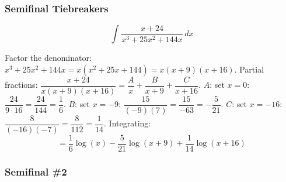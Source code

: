 \subsubsection*{Semifinal Tiebreakers}

\begin{questions}

\question
\[ \int \frac{x+24}{x^3+25x^2+144x}\,dx \]
\begin{solution}
Factor the denominator: $x^3+25x^2+144x=x(x^2+25x+144)=x(x+9)(x+16)$.
Partial fractions: $\dfrac{x+24}{x(x+9)(x+16)}=\dfrac{A}{x}+\dfrac{B}{x+9}+\dfrac{C}{x+16}$.
$A$: set $x=0$: $\dfrac{24}{9\cdot16}=\dfrac{24}{144}=\dfrac16$.
$B$: set $x=-9$: $\dfrac{15}{(-9)(7)}=\dfrac{15}{-63}=-\dfrac{5}{21}$.
$C$: set $x=-16$: $\dfrac{8}{(-16)(-7)}=\dfrac{8}{112}=\dfrac{1}{14}$.
Integrating:
\[ = \frac16\log(x)-\frac{5}{21}\log(x+9)+\frac{1}{14}\log(x+16) \]
\end{solution}

\end{questions}

\subsubsection*{Semifinal \#2}

